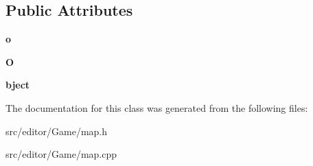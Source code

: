 \subsection*{\-Public \-Attributes}
\begin{DoxyCompactItemize}
\item 
\hypertarget{class_cell_a3dc39362ff9a256688437f0ae40a2e84}{{\bfseries o}}\label{class_cell_a3dc39362ff9a256688437f0ae40a2e84}

\item 
\hypertarget{class_cell_a15fa482b8681ad7c84ba18ab7965651e}{{\bfseries \-O}}\label{class_cell_a15fa482b8681ad7c84ba18ab7965651e}

\item 
\hypertarget{class_cell_a7ad68870ec79073a5b94eb733f74336b}{{\bfseries bject}}\label{class_cell_a7ad68870ec79073a5b94eb733f74336b}

\end{DoxyCompactItemize}


\-The documentation for this class was generated from the following files\-:\begin{DoxyCompactItemize}
\item 
src/editor/\-Game/map.\-h\item 
src/editor/\-Game/map.\-cpp\end{DoxyCompactItemize}
